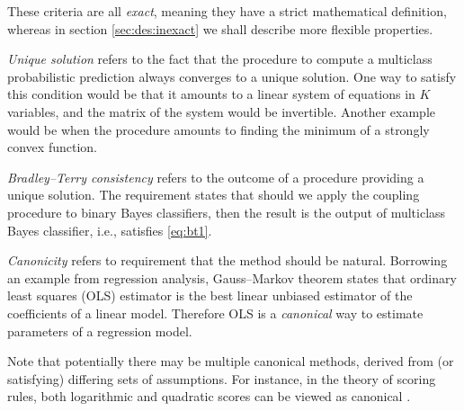 These criteria are all \emph{exact}, meaning they have a strict mathematical definition, whereas  in section \ref{sec:des:inexact} we shall describe more flexible properties. 
%



\emph{Unique solution} refers to the fact that the procedure to compute a multiclass probabilistic prediction always converges to a unique solution. One way to satisfy this condition would be that it amounts to a linear system of equations in $K$ variables, and the matrix of the system would be invertible. Another example would be when the procedure amounts to finding the minimum of a strongly convex function. 

\emph{Bradley--Terry consistency} refers to the outcome of a procedure providing a unique solution. The requirement states that should we apply the coupling procedure to binary Bayes classifiers, then the result is the output of multiclass Bayes classifier, i.e., satisfies \eqref{eq:bt1}.

\emph{Canonicity} refers to requirement that the method should be natural. Borrowing an example from regression analysis, Gauss--Markov theorem states that ordinary least squares (OLS) estimator is the best linear unbiased estimator of the coefficients of a linear model. Therefore OLS  is a \emph{canonical} way to estimate parameters of a regression model. 

Note that potentially there may be multiple canonical methods, derived from (or satisfying) differing sets of assumptions. For instance, in the theory of scoring rules, both logarithmic and quadratic scores can be viewed as canonical \cite{shannon1948mathematical,selten1998axiomatic}.

